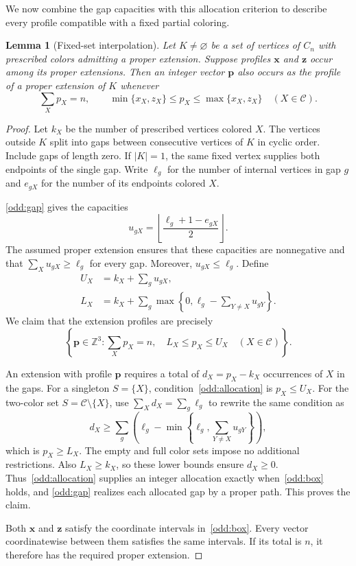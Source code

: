 \documentclass[10pt,a4paper]{amsart}
\numberwithin{equation}{section}
\newtheorem{lemma}[theorem]{Lemma}
\theoremstyle{definition}
\theoremstyle{remark}
\begin{document}
We now combine the gap capacities with this allocation criterion to
describe every profile compatible with a fixed partial coloring.

\begin{lemma}[Fixed-set interpolation]\label{odd:interpolation}
Let $K\ne\varnothing$ be a set of vertices of $C_n$ with prescribed
colors admitting a proper extension. Suppose profiles $\mathbf x$ and
$\mathbf z$ occur among its proper extensions. Then an integer vector
$\mathbf p$ also occurs as the profile of a proper extension of $K$
whenever
\[
\sum_Xp_X=n,
\qquad
\min\{x_X,z_X\}\le p_X\le\max\{x_X,z_X\}
\quad(X\in\mathcal C).
\]
\end{lemma}
\begin{proof}
Let $k_X$ be the number of prescribed vertices colored $X$. The
vertices outside $K$ split into gaps between consecutive vertices of
$K$ in cyclic order. Include gaps of length zero. If $|K|=1$, the
same fixed vertex supplies both endpoints of the single gap.
Write $\ell_g$ for the number of internal vertices in gap $g$ and
$e_{gX}$ for the number of its endpoints colored $X$.

\cref{odd:gap} gives the capacities
\[
u_{gX}=\left\lfloor\frac{\ell_g+1-e_{gX}}2\right\rfloor.
\]
The assumed proper extension ensures that these capacities are
nonnegative and that $\sum_Xu_{gX}\ge\ell_g$ for every gap.
Moreover, $u_{gX}\le\ell_g$. Define
\begin{align*}
U_X&=k_X+\sum_gu_{gX},\\
L_X&=k_X+
\sum_g\max\left\{0,\ell_g-\sum_{Y\ne X}u_{gY}\right\}.
\end{align*}
We claim that the extension profiles are precisely
\begin{equation}\label{odd:box}
\left\{\mathbf p\in\mathbb Z^3:
\sum_Xp_X=n,\quad L_X\le p_X\le U_X
\quad(X\in\mathcal C)\right\}.
\end{equation}

An extension with profile $\mathbf p$ requires a total of
$d_X=p_X-k_X$ occurrences of $X$ in the gaps.
For a singleton $S=\{X\}$, condition~\eqref{odd:allocation} is
$p_X\le U_X$. For the two-color set
$S=\mathcal C\setminus\{X\}$, use $\sum_Xd_X=\sum_g\ell_g$ to rewrite
the same condition as
\[
d_X\ge\sum_g
\left(\ell_g-\min\left\{\ell_g,\sum_{Y\ne X}u_{gY}\right\}\right),
\]
which is $p_X\ge L_X$. The empty and full color sets impose no
additional restrictions. Also $L_X\ge k_X$, so these lower bounds
ensure $d_X\ge0$. Thus~\eqref{odd:allocation} supplies an integer
allocation exactly when~\eqref{odd:box} holds, and
\cref{odd:gap} realizes each allocated gap by a proper path.
This proves the claim.

Both $\mathbf x$ and $\mathbf z$ satisfy the coordinate intervals
in~\eqref{odd:box}. Every vector coordinatewise between them satisfies
the same intervals. If its total is $n$, it therefore has the required
proper extension.
\end{proof}
\end{document}

